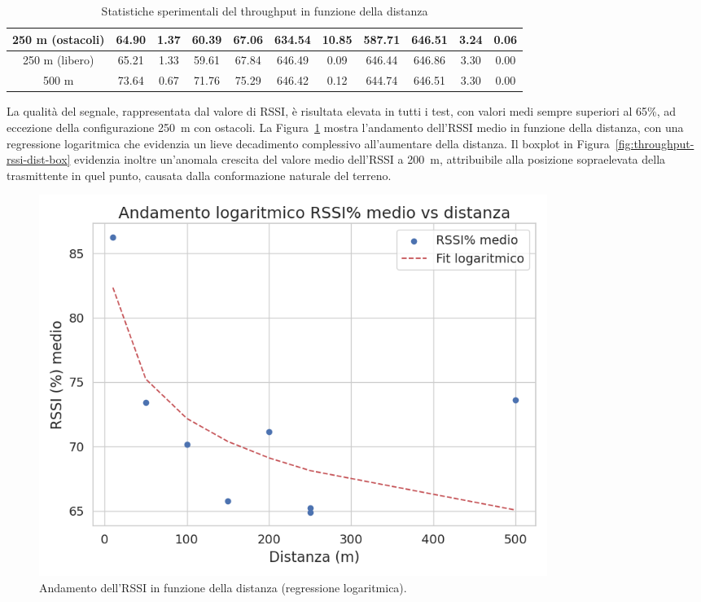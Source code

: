 \documentclass[12pt,a4paper,twoside]{book}
\begin{document}
\begin{table}[H]
{\begin{tabular}{|c|cccc|cccc|cc|}
                250 m (ostacoli)  & 64.90                                   & 1.37                                              & 60.39                               & 67.06        & 634.54 & 10.85 & 587.71 & 646.51 & 3.24 & 0.06 \\ \hline
                250 m (libero)    & 65.21                                   & 1.33                                              & 59.61                               & 67.84        & 646.49 & 0.09  & 646.44 & 646.86 & 3.30 & 0.00 \\ \hline
                500 m             & 73.64                                   & 0.67                                              & 71.76                               & 75.29        & 646.42 & 0.12  & 644.74 & 646.51 & 3.30 & 0.00 \\ \hline
            \end{tabular}
        }
        \caption{Statistiche sperimentali del throughput in funzione della distanza}
        \label{tab:T1-throughput_stats-pdf}
    \end{table}
\fi
La qualità del segnale, rappresentata dal valore di \ac{RSSI}, è risultata elevata
in tutti i test, con valori medi sempre superiori al 65\%, ad eccezione della
configurazione 250~m con ostacoli. La Figura~\ref{fig:throughput-rssi-dist-regression}
mostra l’andamento dell’RSSI medio in funzione della distanza, con una regressione
logaritmica che evidenzia un lieve decadimento complessivo all’aumentare della distanza.
Il boxplot in Figura~\ref{fig:throughput-rssi-dist-box} evidenzia inoltre un’anomala
crescita del valore medio dell’RSSI a 200~m, attribuibile alla posizione sopraelevata
della trasmittente in quel punto, causata dalla conformazione naturale del terreno.

\begin{figure}[H]
    \centering
    \includegraphics[width=0.8\textwidth]{img/tests/T1/T1-rssi_dist_regression.png}
    \caption{Andamento dell'RSSI in funzione della distanza (regressione logaritmica).}
    \label{fig:throughput-rssi-dist-regression}
\end{figure}
\end{document}

